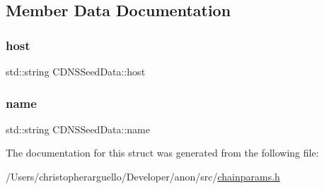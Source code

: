 \subsection{Member Data Documentation}
\mbox{\label{struct_c_d_n_s_seed_data_a70f5da8568016651cfb7ec7dbf01b3f0}} 
\subsubsection{\texorpdfstring{host}{host}}
{\footnotesize\ttfamily std\+::string C\+D\+N\+S\+Seed\+Data\+::host}

\mbox{\label{struct_c_d_n_s_seed_data_a2cf084b163340bd62b67e765799f1fdd}} 
\subsubsection{\texorpdfstring{name}{name}}
{\footnotesize\ttfamily std\+::string C\+D\+N\+S\+Seed\+Data\+::name}



The documentation for this struct was generated from the following file\+:\begin{DoxyCompactItemize}
\item 
/\+Users/christopherarguello/\+Developer/anon/src/\mbox{\hyperlink{chainparams_8h}{chainparams.\+h}}\end{DoxyCompactItemize}
